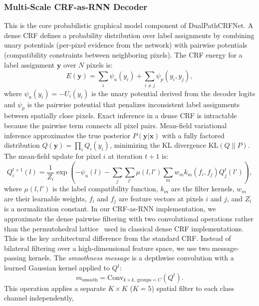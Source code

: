 \documentclass[conference]{IEEEtran}
\begin{document}
\subsubsection{Multi-Scale CRF-as-RNN Decoder}
This is the core probabilistic graphical model component of DualPathCRFNet. A dense CRF defines a
probability distribution over label assignments by combining unary potentials (per-pixel evidence from
the network) with pairwise potentials (compatibility constraints between neighboring pixels). The CRF
energy for a label assignment $\mathbf{y}$ over $N$ pixels is:
\begin{equation}
  E(\mathbf{y}) = \sum_i \psi_u(y_i) + \sum_{i \neq j} \psi_p(y_i, y_j),
  \label{eq:crfenergy}
\end{equation}
where $\psi_u(y_i) = -U_i(y_i)$ is the unary potential derived from the decoder
logits and $\psi_p$ is the pairwise potential that penalizes inconsistent label assignments between spatially
close pixels. Exact inference in a dense CRF is intractable because the pairwise term connects all pixel
pairs. Mean-field variational inference approximates the true posterior
$P(\mathbf{y}|\mathbf{x})$ with a fully factored distribution
$Q(\mathbf{y}) = \prod_i Q_i(y_i)$, minimizing the KL divergence $\mathrm{KL}(Q \| P)$. The mean-field update for pixel $i$ at iteration $t+1$ is:
\begin{equation}
  Q_i^{t+1}(l) = \frac{1}{Z_i}\exp\!\left(-\psi_u(l)
    - \sum_{j}\sum_{l'}\mu(l,l')\sum_m w_m k_m(f_i,f_j)Q_j^t(l')\right),
  \label{eq:mfupdate}
\end{equation}
where $\mu(l, l')$ is the label compatibility function, $k_m$ are the filter kernels, $w_m$ are their learnable weights,
$f_i$ and $f_j$ are feature vectors at pixels $i$ and $j$, and $Z_i$ is a normalization constant. In our CRF-as-RNN
implementation, we approximate the dense pairwise filtering with two convolutional operations rather
than the permutohedral lattice~\cite{kiefel2014permutohedral} used in classical dense CRF implementations. This is the key
architectural difference from the standard CRF. Instead of bilateral filtering over a high-dimensional
feature space, we use two message-passing kernels. The \emph{smoothness message} is a depthwise convolution with a learned
Gaussian kernel applied to $Q^t$:
\begin{equation}
  m_{\mathrm{smooth}} = \mathrm{Conv}_{k\times k,\,\mathrm{groups}=C}(Q^t).
  \label{eq:msmooth}
\end{equation}
This operation applies a separate $K\times K$ ($K=5$) spatial filter to each class channel independently,
\end{document}
